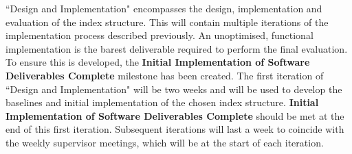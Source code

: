 ``Design and Implementation" encompasses the design, implementation and evaluation of the index structure. This will contain multiple iterations of the implementation process described previously. An unoptimised, functional implementation is the barest deliverable required to perform the final evaluation. To ensure this is developed, the \textbf{Initial Implementation of Software Deliverables Complete} milestone has been created. The first iteration of ``Design and Implementation" will be two weeks and will be used to develop the baselines and initial implementation of the chosen index structure. \textbf{Initial Implementation of Software Deliverables Complete} should be met at the end of this first iteration. Subsequent iterations will last a week to coincide with the weekly supervisor meetings, which will be at the start of each iteration. 
